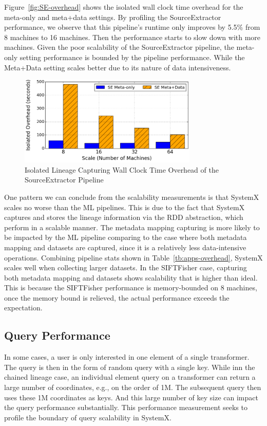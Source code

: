 \documentclass{sig-alternate}
\begin{document}
Figure~\ref{fig:SE-overhead} shows the isolated wall clock time overhead for the meta-only and meta+data settings.
By profiling the SourceExtractor performance, we observe that this pipeline's runtime only improves by 5.5\% from 8 machines
to 16 machines. Then the performance starts to slow down with more machines.
Given the poor scalability of the SourceExtractor pipeline, the meta-only setting performance is bounded by the pipeline performance.
While the Meta+Data setting scales better due to its nature of data intensiveness.
\begin{figure}[t]
\begin{center}
    \includegraphics[width=85mm]{pictures/Overhead-Time-SE}
\caption {Isolated Lineage Capturing Wall Clock Time Overhead of the SourceExtractor Pipeline
    \label{fig:VOC-overhead}
}
\end{center}
\end{figure}

One pattern we can conclude from the scalability measurements is that SystemX scales no worse than the ML pipelines.
This is due to the fact that SystemX captures and stores the lineage information via the RDD abstraction, which perform
in a scalable manner. 
The metadata mapping capturing is more likely to be impacted by the ML pipeline comparing to the case where both metadata
mapping and datasets are captured, since it is a relatively less data-intensive operations.
Combining pipeline stats shown in Table~\ref{tb:apps-overhead}, SystemX scales  well when collecting larger datasets.
In the SIFTFisher case, capturing both metadata mapping and datasets shows scalability that is higher than ideal.
This is because the SIFTFisher performance is memory-bounded on 8 machines, once the memory bound is relieved, the actual performance
exceeds the expectation.

\subsection{Query Performance}
In some cases, a user is only interested in one element of a single transformer.
The query is then in the form of random query with a single key.
While inn the chained lineage case, an individual element query on a transformer can return a large number of coordinates, e.g., on the order of 1M. 
The subsequent query then uses these 1M coordinates as keys.
And this large number of key size can impact the query performance substantially.  
This performance measurement seeks to profile the boundary of query scalability in SystemX. 
\end{document}
